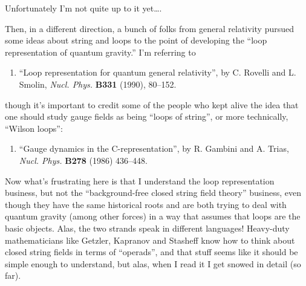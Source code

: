 \documentclass{article}
\def\tightlist{}
\renewcommand{\texttt}[1]{%
  \begingroup
  \ttfamily
  \begingroup\lccode`~=`/\lowercase{\endgroup\def~}{/\discretionary{}{}{}}%
  \begingroup\lccode`~=`[\lowercase{\endgroup\def~}{[\discretionary{}{}{}}%
  \begingroup\lccode`~=`.\lowercase{\endgroup\def~}{.\discretionary{}{}{}}%
  \catcode`/=\active\catcode`[=\active\catcode`.=\active
  \scantokens{#1\noexpand}%
  \endgroup
}
\begin{document}

Unfortunately I'm not quite up to it yet\ldots.

Then, in a different direction, a bunch of folks from general relativity
pursued some ideas about string and loops to the point of developing the
``loop representation of quantum gravity.'' I'm referring to

\begin{enumerate}
\def\labelenumi{\arabic{enumi})}
\setcounter{enumi}{4}
\tightlist
\item
  ``Loop representation for quantum general relativity'', by C. Rovelli
  and L. Smolin, \emph{Nucl. Phys.} \textbf{B331} (1990), 80--152.
\end{enumerate}

though it's important to credit some of the people who kept alive the
idea that one should study gauge fields as being ``loops of string'', or
more technically, ``Wilson loops'':

\begin{enumerate}
\def\labelenumi{\arabic{enumi})}
\setcounter{enumi}{5}
\tightlist
\item
  ``Gauge dynamics in the C-representation'', by R. Gambini and A.
  Trias, \emph{Nucl. Phys.} \textbf{B278} (1986) 436--448.
\end{enumerate}

Now what's frustrating here is that I understand the loop representation
business, but not the ``background-free closed string field theory''
business, even though they have the same historical roots and are both
trying to deal with quantum gravity (among other forces) in a way that
assumes that loops are the basic objects. Alas, the two strands speak in
different languages! Heavy-duty mathematicians like Getzler, Kapranov
and Stasheff know how to think about closed string fields in terms of
``operads'', and that stuff seems like it should be simple enough to
understand, but alas, when I read it I get snowed in detail (so far).
\end{document}
